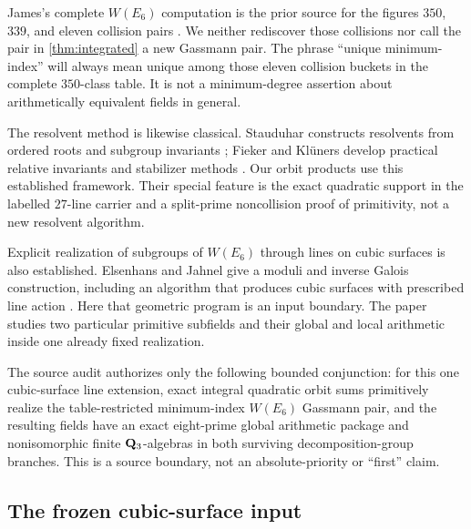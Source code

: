 James's complete $W(E_6)$ computation is the prior source for the figures
$350$, $339$, and eleven collision pairs
\citep[\S3.1, p.~22]{james2022bayesian}.  We neither rediscover those
collisions nor call the pair in \cref{thm:integrated} a new Gassmann pair.
The phrase ``unique minimum-index'' will always mean unique among those
eleven collision buckets in the complete $350$-class table.  It is not a
minimum-degree assertion about arithmetically equivalent fields in general.

The resolvent method is likewise classical.  Stauduhar constructs resolvents
from ordered roots and subgroup invariants
\citep{stauduhar1973determination}; Fieker and Kl\"uners develop practical
relative invariants and stabilizer methods
\citep[\S\S1--2 and Remark~2.1]{fiekerklueners2014computation}.  Our orbit
products use this established framework.  Their special feature is the exact
quadratic support in the labelled $27$-line carrier and a split-prime
noncollision proof of primitivity, not a new resolvent algorithm.

Explicit realization of subgroups of $W(E_6)$ through lines on cubic
surfaces is also established.  Elsenhans and Jahnel give a moduli and inverse
Galois construction, including an algorithm that produces cubic surfaces
with prescribed line action
\citep[Theorem in the introduction, Algorithm~5.1, and
Algorithm~A.10]{elsenhansjahnel2015moduli}.  Here that geometric program is
an input boundary.  The paper studies two particular primitive subfields and
their global and local arithmetic inside one already fixed realization.

The source audit authorizes only the following bounded conjunction: for this one
cubic-surface line extension, exact integral quadratic orbit sums
primitively realize the table-restricted minimum-index $W(E_6)$ Gassmann
pair, and the resulting fields have an exact eight-prime global arithmetic
package and nonisomorphic finite \etale{} $\mathbf{Q}_{3}$-algebras in both
surviving decomposition-group branches.  This is a source boundary, not an
absolute-priority or ``first'' claim.

\subsection{The frozen cubic-surface input}


